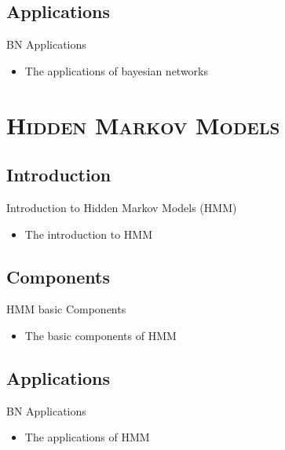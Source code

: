 \documentclass[xcolor=x11names,compress]{beamer}
\renewcommand{\(}{\begin{columns}}
\renewcommand{\)}{\end{columns}}
\newcommand{\<}[1]{\begin{column}{#1}}
\renewcommand{\>}{\end{column}}
\begin{document}
\subsection{Applications}
\begin{frame}{BN Applications}
\begin{itemize}
	\item The applications of bayesian networks
\end{itemize}
\end{frame}

\section{\scshape Hidden Markov Models}
\subsection{Introduction}
\begin{frame}{Introduction to Hidden Markov Models (HMM)}
\begin{itemize}
	\item The introduction to HMM
\end{itemize}
\end{frame}

\subsection{Components}
\begin{frame}{HMM basic Components}
\begin{itemize}
	\item The basic components of HMM
\end{itemize}
\end{frame}

\subsection{Applications}
\begin{frame}{BN Applications}
\begin{itemize}
	\item The applications of HMM
\end{itemize}
\end{frame}
\end{document}
